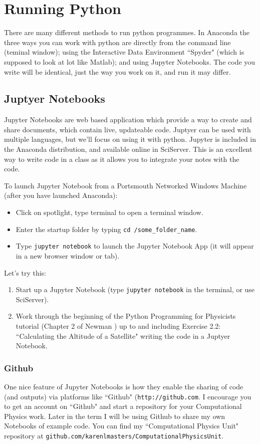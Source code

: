 \documentclass[%
 reprint,
 amsmath,amssymb,
 aps,
]{revtex4-1}
\begin{document}
\section{Running Python}

There are many different methods to run python programmes. In Anaconda the three ways you can work with python are directly from the command line (teminal window); using the Interactive Data Environment ``Spyder" (which is supposed to look at lot like Matlab); and using Jupyter Notebooks. The code you write will be identical, just the way you work on it, and run it may differ. 

\subsection{Juptyer Notebooks}

Jupyter Notebooks are web based application which provide a way to create and share documents, which contain live, updateable code. Juptyer can be used with multiple languages, but we'll focus on using it with python. Jupyter is included in the Anaconda distribution, and available online in SciServer. This is an excellent way to write code in a class as it allows you to integrate your notes with the code. 

To launch Jupyter Notebook from a Portsmouth Networked Windows Machine (after you have launched Anaconda): 
\begin{itemize}
\item Click on spotlight, type terminal to open a terminal window.
\item Enter the startup folder by typing {\tt cd /some\_folder\_name}.
\item Type {\tt jupyter notebook} to launch the Jupyter Notebook App (it will appear in a new browser window or tab).
\end{itemize}

Let's try this: 
\begin{enumerate}
\item Start up a Jupyter Notebook (type {\tt jupyter notebook} in the terminal, or use SciServer).
\item Work through the beginning of the Python Programming for Physicists tutorial (Chapter 2 of Newman \cite{newman}) up to and including Exercise 2.2: ``Calculating the Altitude of a Satellite" writing the code in a Juptyer Notebook.
\end{enumerate}

\subsubsection{Github}
 One nice feature of Jupyter Notebooks is how they enable the sharing of code (and outputs) via platforms like ``Github" ({\tt http://github.com}. I encourage you to get an account on ``Github" and start a repository for your Computational Physics work. Later in the term I will be using Github to share my own Notebooks of example code. You can find my ``Computational Physics Unit" repository at {\tt github.com/karenlmasters/ComputationalPhysicsUnit}. 
\end{document}
